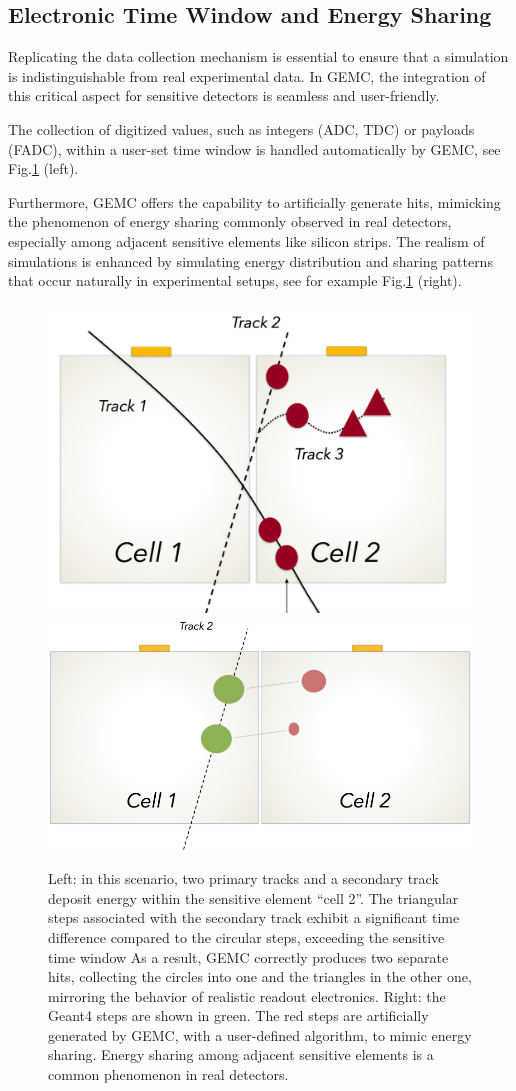 \subsection{Electronic Time Window and Energy Sharing}
\label{subsec:time_window}

Replicating the data collection mechanism is essential to ensure that a simulation is
indistinguishable from real experimental data.
In GEMC, the integration of this critical aspect for sensitive detectors is seamless and user-friendly.

The collection of digitized values, such as integers (ADC, TDC)
or payloads (FADC), within a user-set time window is handled automatically by GEMC,
see Fig.\ref{fig:time_window_energy_sharing} (left).

Furthermore, GEMC offers the capability to artificially generate hits, mimicking the phenomenon of
energy sharing commonly observed in real detectors, especially among adjacent sensitive elements like silicon strips.
The realism of simulations is enhanced by simulating energy distribution and sharing patterns
that occur naturally in experimental setups, see for example Fig.\ref{fig:time_window_energy_sharing} (right).

\begin{figure}[h]
    \centering
    \includegraphics[width=.45\textwidth]{img/tw}
    \includegraphics[width=.54\textwidth]{img/e_sharing}
    \caption{Left: in this scenario, two primary tracks and a secondary track deposit energy within
    the sensitive element ``cell 2''. The triangular steps associated with the secondary track
    exhibit a significant time difference compared to the circular steps, exceeding the sensitive time window
    As a result, GEMC correctly produces two separate hits, collecting the circles into one and the triangles
    in the other one, mirroring the behavior of realistic readout electronics.
    Right: the Geant4 steps are shown in green. The red steps are artificially generated
    by GEMC, with a user-defined algorithm, to mimic energy sharing.
    Energy sharing among adjacent sensitive elements is a common phenomenon in real detectors.}
    \label{fig:time_window_energy_sharing}
\end{figure}

